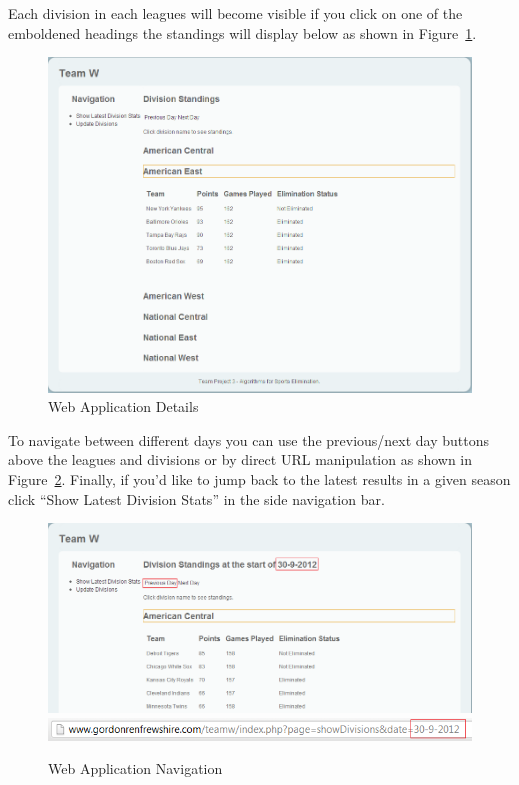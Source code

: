 Each division in each leagues will become visible if you click on one of
the emboldened headings the standings will display below as shown in
Figure~\ref{fig:WEBINFO}.

\begin{figure}
\includegraphics[width=\linewidth,keepaspectratio]{images/userManualWeb2.png}
\caption{Web Application Details}\label{fig:WEBINFO}
\end{figure}

To navigate between different days you can use the previous/next day buttons
above the leagues and divisions or by direct URL manipulation as shown
in Figure~\ref{fig:WEBNAV}. Finally, if you'd like to jump back to the
latest results in a given season click ``Show Latest Division Stats''
in the side navigation bar.

\begin{figure}
\includegraphics[width=\linewidth,keepaspectratio]{images/userManualWeb3.png}
\includegraphics[width=\linewidth,keepaspectratio]{images/userManualWeb4.png}
\caption{Web Application Navigation}\label{fig:WEBNAV}
\end{figure}

